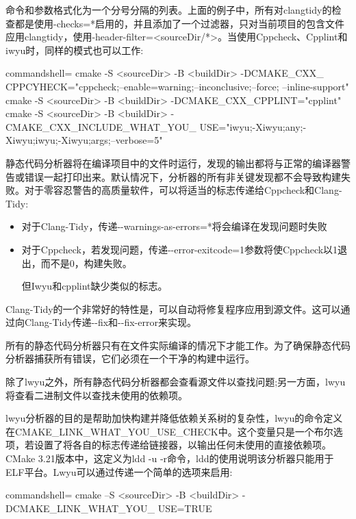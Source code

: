 命令和参数格式化为一个分号分隔的列表。上面的例子中，所有对clangtidy的检查都是使用-checks=*启用的，并且添加了一个过滤器，只对当前项目的包含文件应用clangtidy，使用-header-filter=<sourceDir/*>。当使用Cppcheck、Cpplint和iwyu时，同样的模式也可以工作:

\begin{tcblisting}{commandshell={}}
cmake -S <sourceDir> -B <buildDir> -DCMAKE_CXX_
  CPPCYHECK="cppcheck;--enable=warning;--inconclusive;--force;
    --inline-support"
cmake -S <sourceDir> -B <buildDir> -DCMAKE_CXX_CPPLINT="cpplint"
cmake -S <sourceDir> -B <buildDir> -CMAKE_CXX_INCLUDE_WHAT_YOU_
  USE="iwyu;-Xiwyu;any;-Xiwyu;iwyu;-Xiwyu;args;--verbose=5"
\end{tcblisting}

静态代码分析器将在编译项目中的文件时运行，发现的输出都将与正常的编译器警告或错误一起打印出来。默认情况下，分析器的所有非关键发现都不会导致构建失败。对于零容忍警告的高质量软件，可以将适当的标志传递给Cppcheck和Clang-Tidy:

\begin{itemize}
\item 
对于Clang-Tidy，传递-{}-warnings-as-errors=*将会编译在发现问题时失败

\item 
对于Cppcheck，若发现问题，传递-{}-error-exitcode=1参数将使Cppcheck以1退出，而不是0，构建失败。

但Iwyu和cpplint缺少类似的标志。
\end{itemize}

Clang-Tidy的一个非常好的特性是，可以自动将修复程序应用到源文件。这可以通过向Clang-Tidy传递-{}-fix和-{}-fix-error来实现。

\begin{tcolorbox}[colback=blue!5!white,colframe=blue!75!black,title=增量构建时的注意事项]
所有的静态代码分析器只有在文件实际编译的情况下才能工作。为了确保静态代码分析器捕获所有错误，它们必须在一个干净的构建中运行。
\end{tcolorbox}

除了lwyu之外，所有静态代码分析器都会查看源文件以查找问题;另一方面，lwyu将查看二进制文件以查找未使用的依赖项。

lwyu分析器的目的是帮助加快构建并降低依赖关系树的复杂性，lwyu的命令定义在CMAKE\_LINK\_WHAT\_YOU\_USE\_CHECK中。这个变量只是一个布尔选项，若设置了将各自的标志传递给链接器，以输出任何未使用的直接依赖项。CMake 3.21版本中，这定义为ldd -u -r命令，ldd的使用说明该分析器只能用于ELF平台。Lwyu可以通过传递一个简单的选项来启用:

\begin{tcblisting}{commandshell={}}
cmake –S <sourceDir> -B <buildDir> -DCMAKE_LINK_WHAT_YOU_
  USE=TRUE
\end{tcblisting}

